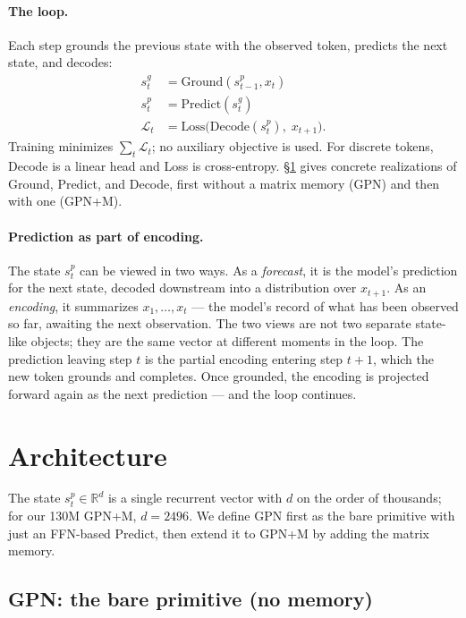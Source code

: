 \documentclass{article}
\begin{document}
\paragraph{The loop.} Each step grounds the previous state with the
observed token, predicts the next state, and decodes:
\begin{align}
s^g_t &= \text{Ground}(s^p_{t-1}, x_t) \label{eq:ground}\\
s^p_t &= \text{Predict}(s^g_t) \label{eq:predict}\\
\mathcal{L}_t &= \text{Loss}\big(\text{Decode}(s^p_t),\; x_{t+1}\big). \label{eq:loss}
\end{align}
Training minimizes $\sum_t \mathcal{L}_t$; no auxiliary objective is
used. For discrete tokens, Decode is a linear head and Loss is
cross-entropy. \S\ref{sec:architecture} gives concrete realizations
of Ground, Predict, and Decode, first without a matrix memory (GPN)
and then with one (GPN+M).

\paragraph{Prediction as part of encoding.} The state $s^p_t$ can
be viewed in two ways. As a \emph{forecast}, it is the model's
prediction for the next state, decoded downstream into a
distribution over $x_{t+1}$. As an \emph{encoding}, it summarizes
$x_1, \ldots, x_t$ --- the model's record of what has been observed
so far, awaiting the next observation. The two views are not two
separate state-like objects; they are the same vector at different
moments in the loop. The prediction leaving step $t$ is the partial
encoding entering step $t+1$, which the new token grounds and
completes. Once grounded, the encoding is projected forward again
as the next prediction --- and the loop continues.

\FloatBarrier

\section{Architecture}
\label{sec:architecture}

The state $s^p_t \in \mathbb{R}^d$ is a single recurrent vector with
$d$ on the order of thousands; for our 130M GPN+M, $d = 2496$. We
define GPN first as the bare primitive with just an FFN-based
Predict, then extend it to GPN+M by adding the matrix memory.

\subsection{GPN: the bare primitive (no memory)}
\end{document}
